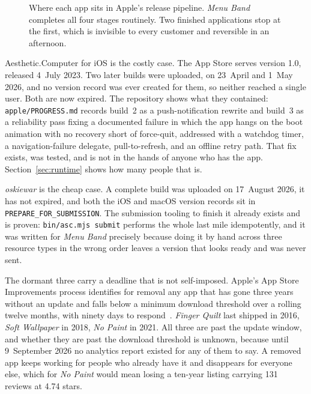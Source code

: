 \documentclass[10pt,letterpaper,twocolumn]{article}
\newcommand{\acdot}{{\color{acpink}.}}
\newcommand{\ac}{Aesthetic{\acdot}Computer}
\begin{document}
\begin{figure}[t]
\caption{Where each app sits in Apple's release pipeline. \emph{Menu Band} completes all four stages routinely. Two finished applications stop at the first, which is invisible to every customer and reversible in an afternoon.}
\label{fig:pipeline}
\end{figure}

\ac{} for iOS is the costly case. The App Store serves
version 1.0, released 4~July 2023. Two later builds were uploaded, on
23~April and 1~May 2026, and no version record was ever created for
them, so neither reached a single user. Both are now expired. The
repository shows what they contained: \texttt{apple/PROGRESS.md} records
build~2 as a push-notification rewrite and build~3 as a reliability pass
fixing a documented failure in which the app hangs on the boot animation
with no recovery short of force-quit, addressed with a watchdog timer, a
navigation-failure delegate, pull-to-refresh, and an offline retry path.
That fix exists, was tested, and is not in the hands of anyone who has
the app. Section~\ref{sec:runtime} shows how many people that is.

\emph{oskiewar} is the cheap case. A complete build was uploaded on
17~August 2026, it has not expired, and both the iOS and macOS version
records sit in \texttt{PREPARE\_FOR\_SUBMISSION}. The submission tooling
to finish it already exists and is proven: \texttt{bin/asc.mjs submit}
performs the whole last mile idempotently, and it was written for
\emph{Menu Band} precisely because doing it by hand across three resource
types in the wrong order leaves a version that looks ready and was never
sent.

The dormant three carry a deadline that is not self-imposed. Apple's App
Store Improvements process identifies for removal any app that has gone
three years without an update and falls below a minimum download
threshold over a rolling twelve months, with ninety days to
respond~\citep{apple2022improvements}. \emph{Finger Quilt} last shipped
in 2016, \emph{Soft Wallpaper} in 2018, \emph{No Paint} in 2021. All
three are past the update window, and whether they are past the download
threshold is unknown, because until 9~September 2026 no analytics report
existed for any of them to say. A removed app keeps working for people
who already have it and disappears for everyone else, which for
\emph{No Paint} would mean losing a ten-year listing carrying 131
reviews at 4.74 stars.
\end{document}
